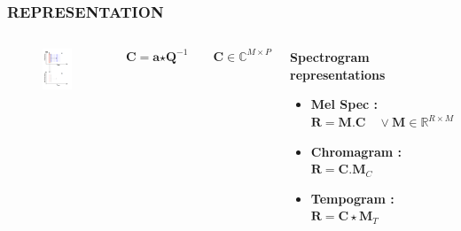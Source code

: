\documentclass{beamer}
\begin{document}
\begin{frame}
\frametitle{REPRESENTATION}
\begin{columns}[c]
\begin{figure}
\includegraphics[width=\textwidth]{rep_2}
\end{figure}
\[
\textbf{C} = \textbf{a} \bm{\star} \textbf{Q}^{-1} \qquad \textbf{C} \in \mathbb{C}^{M \times P}
\]
\begin{block}{\textbf{Spectrogram representations}}
\begin{itemize}
\item \textbf{Mel Spec :}  \\ $\textbf{R} = \textbf{M}. \textbf{C} \quad \vee \textbf{M} \in \mathbb{R}^{R \times M}$
\item \textbf{Chromagram :}\\$\textbf{R} = \textbf{C}.\textbf{M}_{C}$
\item \textbf{Tempogram :}\\$\textbf{R} = \textbf{C} \star \textbf{M}_{T}$  
\end{itemize}
\end{block}
\end{columns}
\end{frame}
\end{document}
